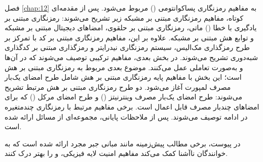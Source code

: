 فصل \ref{chap:12} به مفاهیم رمزنگاری پسا‌کوانتومی () مربوط می‌شود. پس از مقدمه‌ای کوتاه، مفاهیم رمزنگاری مبتنی بر مشبکه زیر تشریح می‌شوند: رمزنگاری مبتنی بر یادگیری با خطا () ماتی، رمزنگاری مبتنی بر  حلقوی، امضاهای دیجیتال مبتنی بر مشبکه و توابع هش مبتنی بر مشبکه. علاوه‌ بر این، مفاهیم رمزنگاری مبتنی بر کد با تمرکز بر طرح رمزگذاری مک‌الیس، سیستم رمزنگاری نیدرایتر و رمزگذاری مبتنی بر کدگذاری  شبه‌دوری تشریح می‌شوند. در بخش بعدی، مفاهیم ترکیبی  توصیف می‌شوند که در آن‌ها  و  به‌صورت تعاملی عمل می‌کنند. موضوع بعدی مربوط به رمزنگاری مبتنی بر هش است؛ این بخش با مفاهیم پایه رمزنگاری مبتنی بر هش شامل طرح امضای یک‌بار مصرف لمپورت آغاز می‌شود. دو طرح رمزنگاری مبتنی بر هش مرتبط تشریح می‌شوند: طرح امضای یک‌بار مصرف وینترنیتز () و طرح امضای مرکل () که برای امضاهای چندبار مصرف قابل اعمال است. برخی مفاهیم مرتبط با رمزنگاری چندمتغیره در ادامه توصیف می‌شوند. پس از ملاحظات پایانی، مجموعه‌ای از مسائل ارائه شده است.

در پیوست، برخی مطالب پیش‌زمینه مانند مبانی جبر مجرد ارائه شده است که به خوانندگان ناآشنا کمک می‌کند مفاهیم امنیت لایه فیزیکی،  و  را بهتر درک کنند.